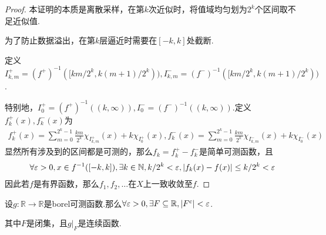\begin{proof}
    {\kaishu 本证明的本质是离散采样，在第\(k\)次近似时，将值域均匀划为\(2^k\)个区间取不足近似值.
    
    为了防止数据溢出，在第\(k\)层逼近时需要在\([-k,k]\)处截断.}

    定义\(I_{k,m}^+=(f^+)^{-1} ([km/2^k , k(m+1)/2^k)), I_{k,m}^-=(f^-)^{-1} ([km/2^k , k(m+1)/2^k))\).

    特别地，\(I_0^+=(f^+)^{-1}((k,\infty)), I_0^-=(f^-)^{-1}((k,\infty))\).定义\(f_k^+(x), f_k^-(x)\)为
    \begin{align*}
        f_k^+(x)=\sum_{m=0}^{2^k-1}\frac{km}{2^k} \chi_{I_{k,m}^+}(x)+k \chi_{I_0^+}(x),
        f_k^-(x)=\sum_{m=0}^{2^k-1}\frac{km}{2^k} \chi_{I_{k,m}^-}(x)+k \chi_{I_0^-}(x)
    \end{align*}
    显然所有涉及到的区间都是可测的，那么\(f_k=f_k^+ - f_k^-\)是简单可测函数，且
    \begin{align*}
        \forall \varepsilon>0, x \in f^{-1}([-k,k]), \exists k \in \mathbb{N}, k/2^k<\varepsilon, \abs*{f_k(x)-f(x)} \leq k/2^k<\varepsilon 
    \end{align*}
    因此若\(f\)是有界函数，那么\(f_1, f_2, \dots\)在\(X\)上一致收敛至\(f\).
\end{proof}

\newpage

\begin{theorem}[2.91]\label{2.91}
    设\(g: \mathbb{R} \to \mathbb{R}\)是borel可测函数.那么\(\forall \varepsilon>0, \exists F \subseteq \mathbb{R}, \abs*{F^c}<\varepsilon\).
    
    其中\(F\)是闭集，且\(\left.g\right|_F\)是连续函数.
\end{theorem}

